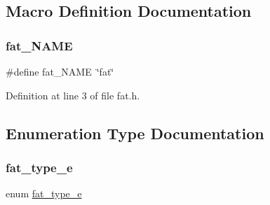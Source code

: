 \subsection{Macro Definition Documentation}
\mbox{\label{a00152_a4f5595e812b05fcd57804005edfa68a2_a4f5595e812b05fcd57804005edfa68a2}} 
\subsubsection{\texorpdfstring{fat\+\_\+\+N\+A\+ME}{fat\_NAME}}
{\footnotesize\ttfamily \#define fat\+\_\+\+N\+A\+ME~\char`\"{}fat\char`\"{}}



Definition at line 3 of file fat.\+h.



\subsection{Enumeration Type Documentation}
\mbox{\label{a00152_a1d614cff279bd01b56283ae2e9bad146_a1d614cff279bd01b56283ae2e9bad146}} 
\subsubsection{\texorpdfstring{fat\+\_\+type\+\_\+e}{fat\_type\_e}}
{\footnotesize\ttfamily enum \hyperlink{a00152_a1d614cff279bd01b56283ae2e9bad146_a1d614cff279bd01b56283ae2e9bad146}{fat\+\_\+type\+\_\+e}}

